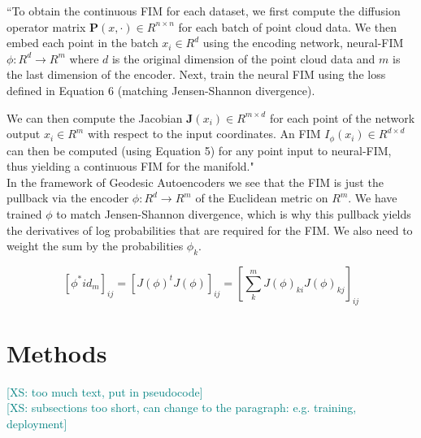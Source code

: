 \documentclass{article}
\theoremstyle{plain}
\theoremstyle{definition}
\theoremstyle{remark}
\newcommand{\xin}[1]{\textcolor{teal}{[XS: #1]}}
\begin{document}
``To obtain the continuous FIM for each dataset, we first compute the diffusion operator matrix $\mathbf{P}(x,\cdot) \in R^{n \times n}$ for each batch of point cloud data. We then embed each point in the batch $x_i \in R^{d}$ using the encoding network, neural-FIM $\phi: R^{d} \to R^{m} $ where $d$ is the original dimension of the point cloud data and $m$ is the last dimension of the encoder. Next, train the neural FIM using the loss defined in Equation 6 (matching Jensen-Shannon divergence).

We can then compute the Jacobian  $\mathbf{J}(x_i) \in R^{m \times d}$ for each point of the network output  $x_i \in R^m$  with respect to the input coordinates. An FIM $I_\phi(x_i) \in R^{d \times d}$ can then be computed (using Equation 5) for any point input to neural-FIM, thus yielding a continuous FIM for the manifold." \\

In the framework of Geodesic Autoencoders we see that the FIM is just the pullback via the encoder $\phi: R^{d} \to R^{m} $ of the Euclidean metric on $R^m$. We have trained $\phi$ to match Jensen-Shannon divergence, which is why this pullback yields the derivatives of log probabilities that are required for the FIM. We also need to weight the sum by the probabilities $\phi_k$.

$$[\phi^* id_m]_{ij} = [J(\phi)^tJ(\phi)]_{ij}= [ \sum_k^m J(\phi)_{ki} J(\phi)_{kj} ]_{ij} $$






\section{Methods}
\xin{too much text, put in pseudocode}\\
\xin{subsections too short, can change to the paragraph: e.g. training, deployment}\\
\end{document}
